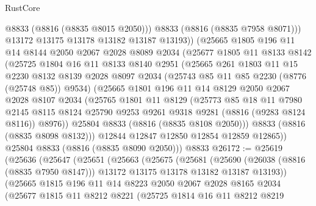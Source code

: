 \begin{lexlean}{RustCore}
\begin{coremodule}
            @8833
            (@8816 (@8835 @8015 @2050)))
          @8833
          (@8816 (@8835 @7958 @8071)))
        @13172
        @13175
        @13178
        @13182
        @13187
        @13193))
    (@25665
      @1805
      @196
      @11
      @14
      @8144
      @2050
      @2067
      @2028
      @8089
      @2034
      (@25677
        @1805
        @11
        @8133
        @8142
        (@25725
          @1804
          @16
          @11
          @8133
          @8140
          @2951
          (@25665
            @261
            @1803
            @11
            @15
            @2230
            @8132
            @8139
            @2028
            @8097
            @2034
            (@25743 @85 @11 @85 @2230 (@8776 (@25748 @85)) @9534)
            (@25665
              @1801
              @196
              @11
              @14
              @8129
              @2050
              @2067
              @2028
              @8107
              @2034
              (@25765
                @1801
                @11
                @8129
                (@25773
                  @85
                  @18
                  @11
                  @7980
                  @2145
                  @8115
                  @8124
                  @25790
                  @9253
                  @9261
                  @9318
                  @9281
                  (@8816 (@9283 @8124 @8116))
                  @8976))
              @25804
              @8833
              (@8816 (@8835 @8108 @2050)))
            @8833
            (@8816 (@8835 @8098 @8132)))
          @12844
          @12847
          @12850
          @12854
          @12859
          @12865))
      @25804
      @8833
      (@8816 (@8835 @8090 @2050)))
    @8833
@26172 := @25619
    (@25636
      (@25647
        (@25651
          (@25663
            (@25675
              (@25681
                (@25690
                  (@26038 (@8816 (@8835 @7950 @8147)))
                  @13172
                  @13175
                  @13178
                  @13182
                  @13187
                  @13193))
              (@25665
                @1815
                @196
                @11
                @14
                @8223
                @2050
                @2067
                @2028
                @8165
                @2034
                (@25677
                  @1815
                  @11
                  @8212
                  @8221
                  (@25725
                    @1814
                    @16
                    @11
                    @8212
                    @8219

\end{coremodule}
\end{lexlean}

